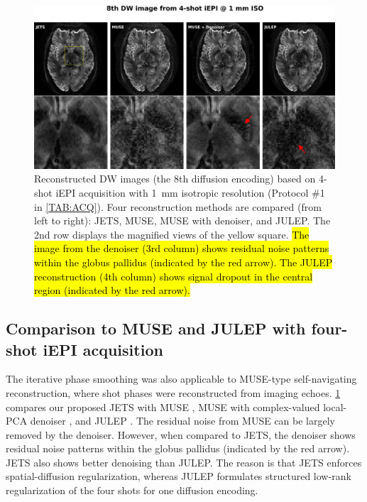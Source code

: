 \documentclass[preprint,12pt,authoryear,review]{elsarticle}
\begin{document}
    \begin{figure}
        \centering
        \includegraphics[width=\textwidth]{../figures/fig4.png}
        \caption{Reconstructed DW images
        (the 8th diffusion encoding)
        based on 4-shot iEPI acquisition with 1~mm isotropic resolution
        (Protocol \#1 in \cref{TAB:ACQ}).
        Four reconstruction methods are compared (from left to right):
        JETS, MUSE, MUSE with denoiser, and JULEP.
        The 2nd row displays the magnified views of the yellow square.
        \hl{The image from the denoiser (3rd column)
        shows residual noise patterns
        within the globus pallidus (indicated by the red arrow).
        The JULEP reconstruction (4th column) shows signal dropout
        in the central region (indicated by the red arrow).}}
        \label{FIG:4shot_comp}
    \end{figure}

    \subsection{Comparison to MUSE and JULEP with four-shot iEPI acquisition}

    The iterative phase smoothing was also applicable to
    MUSE-type self-navigating reconstruction,
    where shot phases were
    reconstructed from imaging echoes.
    \cref{FIG:4shot_comp} compares our proposed JETS with
    MUSE \citep{chen_2013_muse},
    MUSE with complex-valued local-PCA denoiser
    \citep{cordero_2019_cplxdwi},
    and JULEP \citep{dai_2023_julep}.
    The residual noise from MUSE can be largely removed
    by the denoiser. However, when compared to JETS,
    the denoiser shows residual noise patterns within
    the globus pallidus (indicated by the red arrow).
    JETS also shows better denoising than JULEP.
    The reason is that JETS enforces spatial-diffusion regularization,
    whereas JULEP formulates structured low-rank regularization
    of the four shots for one diffusion encoding.
\end{document}
